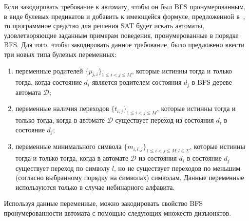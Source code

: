 Если закодировать требование к автомату, чтобы он был BFS пронумерованным, в виде булевых предикатов и добавить к имеющейся формуле, предложенной в~\cite{heule-icgi10}, то программное средство для решения SAT будет искать автоматы, удовлетворяющие заданным примерам поведения, пронумерованные в порядке BFS.
Для того, чтобы закодировать данное требование, было предложено ввести три новых типа булевых переменных:

\begin{enumerate}
  \item переменные родителей $\{p_{j,i}\}_{1 \leq i < j \leq M}$, которые истинны тогда и только тогда, когда состояние $d_i$ является родителем состояния $d_j$ в BFS дереве автомата $\mathcal{D}$;
  \item переменные наличия переходов $\{t_{i,j}\}_{1 \leq i < j \leq M}$, которые истинны тогда и только тогда, когда в автомате $\mathcal{D}$ существует переход из состояния $d_{i}$ в состояние $d_{j}$;
  \item переменные минимального символа $\{m_{i,l,j}\}_{1 \leq i < j \leq M;l \in \Sigma}$, которые истинны тогда и только тогда, когда в автомате $\mathcal{D}$ из состояния $d_{i}$ в состояние $d_{j}$ существует переход по символу $l$, но не существует переходов по меньшим (согласно выбранному порядку на символах) символам.
  Данные переменные используются только в случае небинарного алфавита.
\end{enumerate}

Используя данные переменные, можно закодировать свойство BFS пронумерованности автомата с помощью следующих множеств дизъюнктов.

